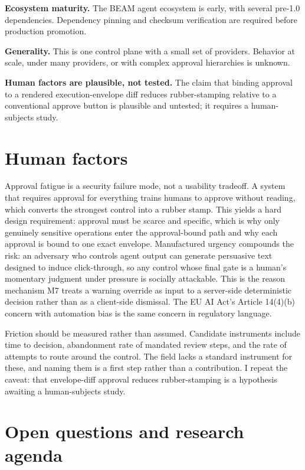 \documentclass[11pt,letterpaper]{article}
\begin{document}
\textbf{Ecosystem maturity.} The BEAM agent ecosystem is early, with several pre-1.0 dependencies. Dependency pinning and checksum verification are required before production promotion.

\textbf{Generality.} This is one control plane with a small set of providers. Behavior at scale, under many providers, or with complex approval hierarchies is unknown.

\textbf{Human factors are plausible, not tested.} The claim that binding approval to a rendered execution-envelope diff reduces rubber-stamping relative to a conventional approve button is plausible and untested; it requires a human-subjects study.

\section{Human factors}\label{sec:humanfactors}

Approval fatigue is a security failure mode, not a usability tradeoff. A system that requires approval for everything trains humans to approve without reading, which converts the strongest control into a rubber stamp. This yields a hard design requirement: approval must be scarce and specific, which is why only genuinely sensitive operations enter the approval-bound path and why each approval is bound to one exact envelope. Manufactured urgency compounds the risk: an adversary who controls agent output can generate persuasive text designed to induce click-through, so any control whose final gate is a human's momentary judgment under pressure is socially attackable. This is the reason mechanism M7 treats a warning override as input to a server-side deterministic decision rather than as a client-side dismissal. The EU AI Act's Article 14(4)(b) concern with automation bias is the same concern in regulatory language.

Friction should be measured rather than assumed. Candidate instruments include time to decision, abandonment rate of mandated review steps, and the rate of attempts to route around the control. The field lacks a standard instrument for these, and naming them is a first step rather than a contribution. I repeat the caveat: that envelope-diff approval reduces rubber-stamping is a hypothesis awaiting a human-subjects study.

\section{Open questions and research agenda}\label{sec:openquestions}
\end{document}
